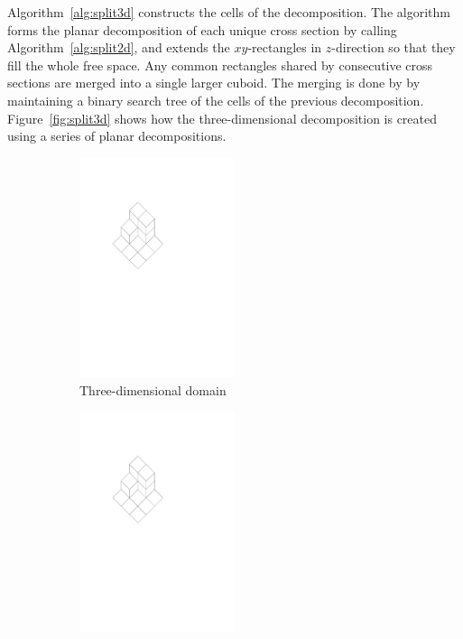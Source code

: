 \documentclass[english,gradu]{tktltiki2018}
\begin{document}
Algorithm~\ref{alg:split3d} constructs the cells of the decomposition.
The algorithm forms the planar decomposition of each unique cross section by calling Algorithm~\ref{alg:split2d}, and extends the $xy$-rectangles in $z$-direction so that they fill the whole free space.
Any common rectangles shared by consecutive cross sections are merged into a single larger cuboid.
The merging is done by by maintaining a binary search tree of the cells of the previous decomposition.
Figure~\ref{fig:split3d} shows how the three-dimensional decomposition is created using a series of planar decompositions.

\begin{figure}\centering
	\begin{subfigure}[t]{0.3\textwidth}\centering
		\includegraphics[width=0.5\textwidth,page=1]{fig/split3d}
		\caption{Three-dimensional domain}
	\end{subfigure}
	\hfil
	\begin{subfigure}[t]{0.3\textwidth}\centering
		\includegraphics[width=0.5\textwidth,page=3]{fig/split3d}

\end{subfigure}
\end{figure}
\end{document}
